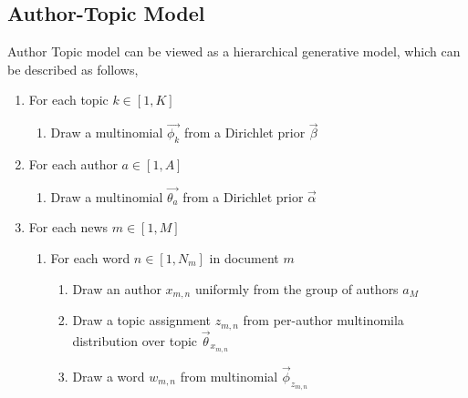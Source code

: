 {\begin{algorithm}
{{{      }
   }
    }

\end{algorithm}


\subsection{Author-Topic Model} \label{Author-Topic model}

Author Topic model can be viewed as a hierarchical generative model, which can be described as follows,
\begin{enumerate}
   \item For each topic $k \in [1,K]$
   \begin{enumerate}
     \item Draw a multinomial $\vec{\phi_k}$ from a Dirichlet prior $\vec{\beta}$
    \end{enumerate}
   \item For each author $a \in [1,A]$
   \begin{enumerate}
     \item Draw a multinomial $\vec{\theta_a}$ from a Dirichlet prior $\vec{\alpha}$
    \end{enumerate}
    \item For each news $m \in [1,M]$
   \begin{enumerate}
     \item For each word $n \in [1,N_m]$ in document $m$
     \begin{enumerate}
            \item Draw an author $x_{m,n}$ uniformly from the group of authors $a_M$
            \item Draw a topic assignment $z_{m,n}$ from per-author multinomila distribution over topic $\vec{\theta}_{x_{m, n}}$ %
            \item Draw a word $w_{m,n}$ from multinomial $\vec{\phi}_{z_{m, n}}$
    \end{enumerate}
    \end{enumerate}
        
\end{enumerate}

}
